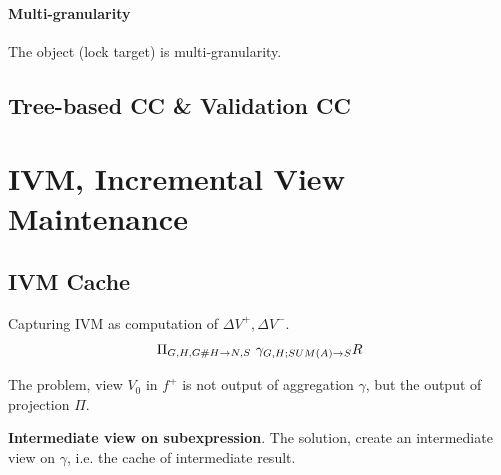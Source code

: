 \documentclass[a4paper]{report}
\begin{document}
\subsubsection{Multi-granularity}
The object (lock target) is multi-granularity. 

\section{Tree-based CC \& Validation CC}


\chapter{IVM, Incremental View Maintenance}

\section{IVM Cache}
Capturing IVM as computation of $\Delta V^+, \Delta V^-$. 
\begin{align*}
\Pi_{G, H, G\#H\rightarrow N, S}\ \gamma_{G, H; SUM(A) \rightarrow S} R
\end{align*}

The problem, view $V_0$ in $f^+$ is not output of aggregation $\gamma$, but the output of projection $\Pi$. 

\textbf{Intermediate view on subexpression}. The solution, create an intermediate view on $\gamma$, i.e. the cache of intermediate result. 
\end{document}
